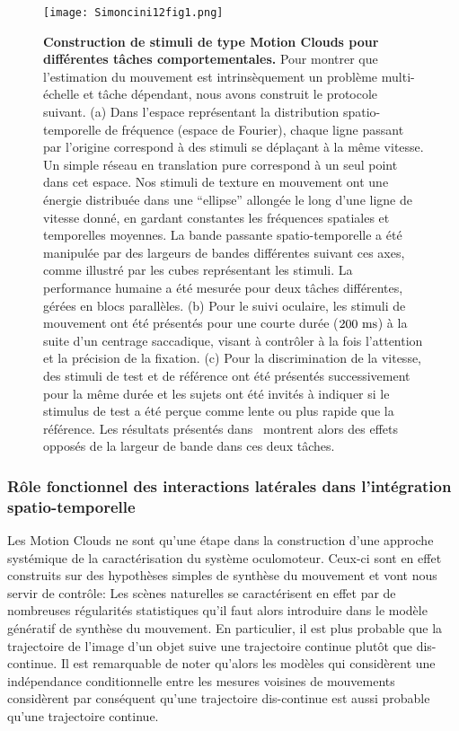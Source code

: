 \begin{figure}%
\centerline{\texttt{[image: Simoncini12fig1.png]}}
\caption{\textbf{Construction de stimuli de type Motion Clouds pour différentes tâches comportementales.} Pour montrer que l'estimation du mouvement est intrinsèquement un problème multi-échelle et tâche dépendant, nous avons construit le protocole suivant. (a) Dans l'espace représentant la distribution spatio-temporelle de fréquence (espace de Fourier), chaque ligne passant par l'origine correspond à des stimuli se déplaçant à la même vitesse. Un simple réseau en translation pure correspond à un seul point dans cet espace. Nos stimuli de texture en mouvement ont une énergie distribuée dans une ``ellipse''  allongée le long d'une ligne de vitesse donné, en gardant constantes les fréquences spatiales et temporelles moyennes. La bande passante spatio-temporelle a été manipulée par des largeurs de bandes différentes suivant ces axes, comme illustré par les cubes représentant les stimuli. La performance humaine a été mesurée pour deux tâches différentes, gérées en blocs parallèles. (b) Pour le suivi oculaire, les stimuli de mouvement ont été présentés pour une courte durée ($200~\si{\milli\second}$) à la suite d'un centrage saccadique, visant à contrôler à la fois l'attention et la précision de la fixation. (c) Pour la discrimination de la vitesse, des stimuli de test et de référence ont été présentés successivement pour la même durée et les sujets ont été invités à indiquer si le stimulus de test a été perçue comme lente ou plus rapide que la référence. Les résultats présentés dans~\citep{Simoncini12} montrent alors des effets opposés de la largeur de bande dans ces deux tâches. %
}%
\label{fig:simoncini12}%
\end{figure}%

\subsubsection{Rôle fonctionnel des interactions latérales dans l'intégration spatio-temporelle%
}%
\label{sec:prediction}%
Les Motion Clouds ne sont qu'une étape dans la construction d'une approche systémique de la caractérisation du système oculomoteur. Ceux-ci sont en effet construits sur des hypothèses simples de synthèse du mouvement et vont nous servir de contrôle: Les scènes naturelles se caractérisent en effet par de nombreuses régularités statistiques qu'il faut alors introduire dans le modèle génératif de synthèse du mouvement. En particulier, il est plus probable que la trajectoire de l'image d'un objet suive une trajectoire continue plutôt que dis-continue. Il est remarquable de noter qu'alors les modèles qui considèrent une indépendance conditionnelle entre les mesures voisines de mouvements considèrent par conséquent qu'une trajectoire dis-continue est aussi probable qu'une trajectoire continue.

